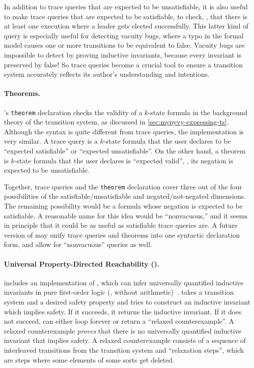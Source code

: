 In addition to trace queries that are expected to be unsatisfiable,
  it is also useful to make trace queries that are expected to be satisfiable,
  to check, \eg, that there is at least one execution where a leader gets elected successfully.
This latter kind of query is especially useful for detecting vacuity bugs,
  where a typo in the formal model causes one or more transitions
  to be equivalent to \textsf{false}.
Vacuity bugs are impossible to detect by proving inductive invariants,
  because every invariant is preserved by \textsf{false}!
So trace queries become a crucial tool to ensure a transition system
  accurately reflects its author's understanding and intentions.

\paragraph{Theorems.}
\mypyvy's \lstinline[language=mypyvy]{theorem} declaration checks
  the validity of a $k$-state formula in the background theory of the transition system,
  as discussed in \cref{sec:mypyvy-expressing-ts}.
Although the syntax is quite different from trace queries,
  the implementation is very similar.
A trace query is a $k$-state formula that the user declares to be
  ``expected satisfiable'' or ``expected unsatisfiable''.
On the other hand, a theorem is $k$-state formula that the user
  declares is ``expected valid'', \ie, its negation is expected to be unsatisfiable.

Together, trace queries and the \lstinline[language=mypyvy]{theorem} declaration
  cover three out of the four possibilities
  of the satisfiable/unsatisfiable and negated/not-negated dimensions.
The remaining possibility would be a formula whose negation is expected to be satisfiable.
A reasonable name for this idea would be ``nonvacuous,''
  and it seems in principle that it could be as useful as satisfiable trace queries are.
A future version of \mypyvy may unify trace queries and theorems
  into one syntactic declaration form,
  and allow for ``nonvacuous'' queries as well.

\paragraph{Universal Property-Directed Reachability (\updr).}
\mypyvy includes an implementation of \updr,
  which can infer universally quantified inductive invariants
  in pure first-order logic (\ie, without arithmetic)~\cite{updr-jacm}.
\updr takes a transition system and a desired safety property
  and tries to construct an inductive invariant which implies safety.
If it succeeds, it returns the inductive invariant.
If it does not succeed,
  \updr can either loop forever or return a ``relaxed  counterexample''.
A relaxed counterexample \emph{proves} that
  there is no universally quantified inductive invariant that implies safety.
A relaxed counterexample consists of a sequence of interleaved
  transitions from the transition system and ``relaxation steps'',
  which are steps where some elements of some sorts get deleted.

